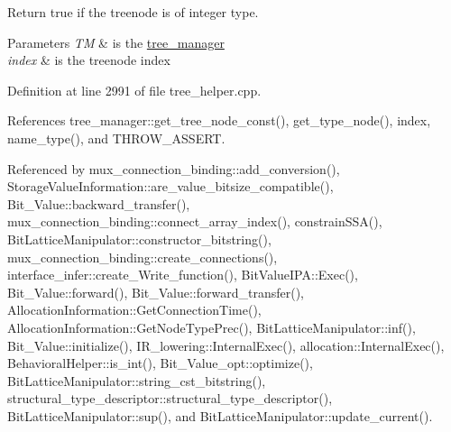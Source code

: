 Return true if the treenode is of integer type. 


\begin{DoxyParams}{Parameters}
{\em TM} & is the \hyperlink{classtree__manager}{tree\+\_\+manager} \\
\hline
{\em index} & is the treenode index \\
\hline
\end{DoxyParams}


Definition at line 2991 of file tree\+\_\+helper.\+cpp.



References tree\+\_\+manager\+::get\+\_\+tree\+\_\+node\+\_\+const(), get\+\_\+type\+\_\+node(), index, name\+\_\+type(), and T\+H\+R\+O\+W\+\_\+\+A\+S\+S\+E\+RT.



Referenced by mux\+\_\+connection\+\_\+binding\+::add\+\_\+conversion(), Storage\+Value\+Information\+::are\+\_\+value\+\_\+bitsize\+\_\+compatible(), Bit\+\_\+\+Value\+::backward\+\_\+transfer(), mux\+\_\+connection\+\_\+binding\+::connect\+\_\+array\+\_\+index(), constrain\+S\+S\+A(), Bit\+Lattice\+Manipulator\+::constructor\+\_\+bitstring(), mux\+\_\+connection\+\_\+binding\+::create\+\_\+connections(), interface\+\_\+infer\+::create\+\_\+\+Write\+\_\+function(), Bit\+Value\+I\+P\+A\+::\+Exec(), Bit\+\_\+\+Value\+::forward(), Bit\+\_\+\+Value\+::forward\+\_\+transfer(), Allocation\+Information\+::\+Get\+Connection\+Time(), Allocation\+Information\+::\+Get\+Node\+Type\+Prec(), Bit\+Lattice\+Manipulator\+::inf(), Bit\+\_\+\+Value\+::initialize(), I\+R\+\_\+lowering\+::\+Internal\+Exec(), allocation\+::\+Internal\+Exec(), Behavioral\+Helper\+::is\+\_\+int(), Bit\+\_\+\+Value\+\_\+opt\+::optimize(), Bit\+Lattice\+Manipulator\+::string\+\_\+cst\+\_\+bitstring(), structural\+\_\+type\+\_\+descriptor\+::structural\+\_\+type\+\_\+descriptor(), Bit\+Lattice\+Manipulator\+::sup(), and Bit\+Lattice\+Manipulator\+::update\+\_\+current().


